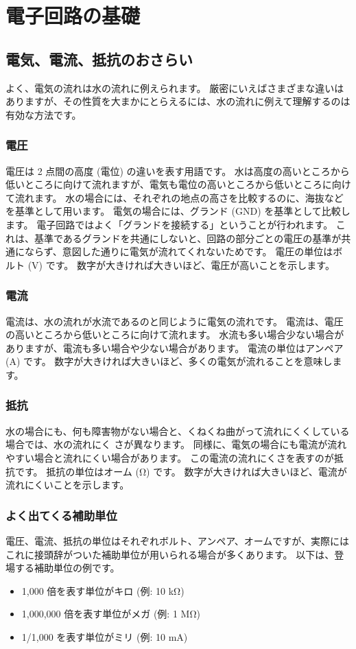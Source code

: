 \documentclass[11pt,a4paper]{jarticle}
\begin{document}
\section{電子回路の基礎}

\subsection*{電気、電流、抵抗のおさらい}
よく、電気の流れは水の流れに例えられます。
厳密にいえばさまざまな違いはありますが、その性質を大まかにとらえるには、水の流れに例えて理解するのは有効な方法です。

\subsubsection*{電圧}
電圧は 2 点間の高度 (電位) の違いを表す用語です。
水は高度の高いところから低いところに向けて流れますが、電気も電位の高いところから低いところに向けて流れます。
水の場合には、それぞれの地点の高さを比較するのに、海抜などを基準として用います。
電気の場合には、グランド (GND) を基準として比較します。
電子回路ではよく「グランドを接続する」ということが行われます。
これは、基準であるグランドを共通にしないと、回路の部分ごとの電圧の基準が共通にならず、意図した通りに電気が流れてくれないためです。
電圧の単位はボルト (V) です。
数字が大きければ大きいほど、電圧が高いことを示します。

\subsubsection*{電流}
電流は、水の流れが水流であるのと同じように電気の流れです。
電流は、電圧の高いところから低いところに向けて流れます。
水流も多い場合少ない場合がありますが、電流も多い場合や少ない場合があります。
電流の単位はアンペア (A) です。
数字が大きければ大きいほど、多くの電気が流れることを意味します。

\subsubsection*{抵抗}
水の場合にも、何も障害物がない場合と、くねくね曲がって流れにくくしている場合では、水の流れにく
さが異なります。
同様に、電気の場合にも電流が流れやすい場合と流れにくい場合があります。
この電流の流れにくさを表すのが抵抗です。
抵抗の単位はオーム (Ω) です。
数字が大きければ大きいほど、電流が流れにくいことを示します。

\subsubsection*{よく出てくる補助単位}
電圧、電流、抵抗の単位はそれぞれボルト、アンペア、オームですが、実際にはこれに接頭辞がついた補助単位が用いられる場合が多くあります。
以下は、登場する補助単位の例です。
\begin{itemize}
 \item 1,000 倍を表す単位がキロ (例: 10 kΩ)
 \item 1,000,000 倍を表す単位がメガ (例: 1 MΩ)
 \item 1/1,000 を表す単位がミリ (例: 10 mA)
\end{itemize}
\end{document}
